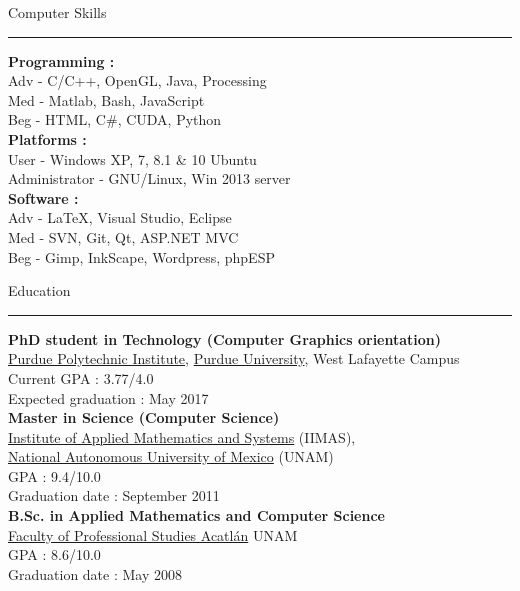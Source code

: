 \documentclass[letterpaper,10pt]{article}
\begin{document}
\begin{minipage}{0.40\textwidth}
\vspace*{-0.5cm}
 {\large{Computer Skills}} \\
 \textcolor{Dandelion}{\rule{0.5\textwidth}{0.05in}} 

\textbf{Programming :} \\
Adv - C/C++, OpenGL, Java, Processing \\
Med - Matlab, Bash, JavaScript \\
Beg - HTML, C\#, CUDA, Python\\

\textbf{Platforms :} \\
User - Windows XP, 7, 8.1 \& 10 Ubuntu \\
Administrator - GNU/Linux, Win 2013 server\\

\textbf{Software :} \\
Adv - \LaTeX, Visual Studio, Eclipse \\
Med - SVN, Git, Qt, ASP.NET MVC \\
Beg - Gimp, InkScape,  Wordpress, phpESP\\
\end{minipage}
%
\hspace{0.025\textwidth}
%
\begin{minipage}{0.70\textwidth} 
\vspace*{1.0cm}
{\centering \large{{Education}}} \\
\textcolor{Dandelion}{\rule{0.4\textwidth}{0.05in}}

\textbf{PhD student in Technology (Computer Graphics orientation)} \\
\href{http://polytechnic.purdue.edu/}{Purdue Polytechnic Institute}, \href{http://www.purdue.edu/}{Purdue University}, West Lafayette Campus \\
Current GPA : 3.77/4.0 \\
Expected graduation : May 2017 \\

\textbf{Master in Science (Computer Science)} \\
\href{http://www.iimas.unam.mx/}{Institute of Applied Mathematics and Systems} (IIMAS), \\ \href{http://www.unam.mx/}{National Autonomous University of Mexico} (UNAM) \\
GPA : 9.4/10.0 \\
Graduation date : September 2011 \\

\textbf{B.Sc. in Applied Mathematics and Computer Science} \\
\href{http://www.acatlan.unam.mx/}{Faculty of Professional Studies Acatl\'{a}n} UNAM \\
GPA : 8.6/10.0 \\
Graduation date : May 2008\\
\end{minipage} 
\end{document}

